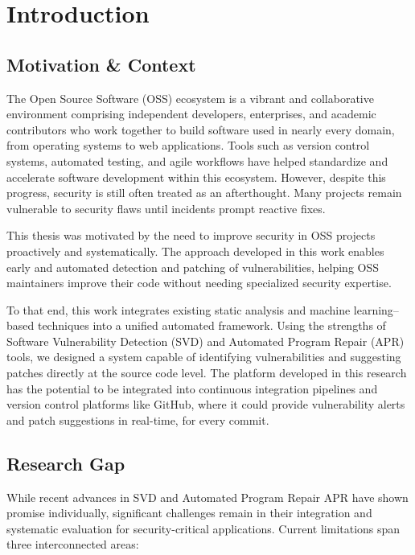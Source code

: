 \chapter{Introduction} \label{chap:intro}

\section{Motivation \& Context} \label{sec:se1}

The Open Source Software (OSS) ecosystem is a vibrant and collaborative environment comprising independent developers, enterprises, and academic contributors who work together to build software used in nearly every domain, from operating systems to web applications. Tools such as version control systems, automated testing, and agile workflows have helped standardize and accelerate software development within this ecosystem. However, despite this progress, security is still often treated as an afterthought. Many projects remain vulnerable to security flaws until incidents prompt reactive fixes.

This thesis was motivated by the need to improve security in OSS projects proactively and systematically. The approach developed in this work enables early and automated detection and patching of vulnerabilities, helping OSS maintainers improve their code without needing specialized security expertise.

To that end, this work integrates existing static analysis and machine learning–based techniques into a unified automated framework. Using the strengths of Software Vulnerability Detection (SVD) and Automated Program Repair (APR) tools, we designed a system capable of identifying vulnerabilities and suggesting patches directly at the source code level. The platform developed in this research has the potential to be integrated into continuous integration pipelines and version control platforms like GitHub, where it could provide vulnerability alerts and patch suggestions in real-time, for every commit.

\section{Research Gap} \label{sec:ae2}

While recent advances in SVD and Automated Program Repair APR have shown promise individually, significant challenges remain in their integration and systematic evaluation for security-critical applications. Current limitations span three interconnected areas:

